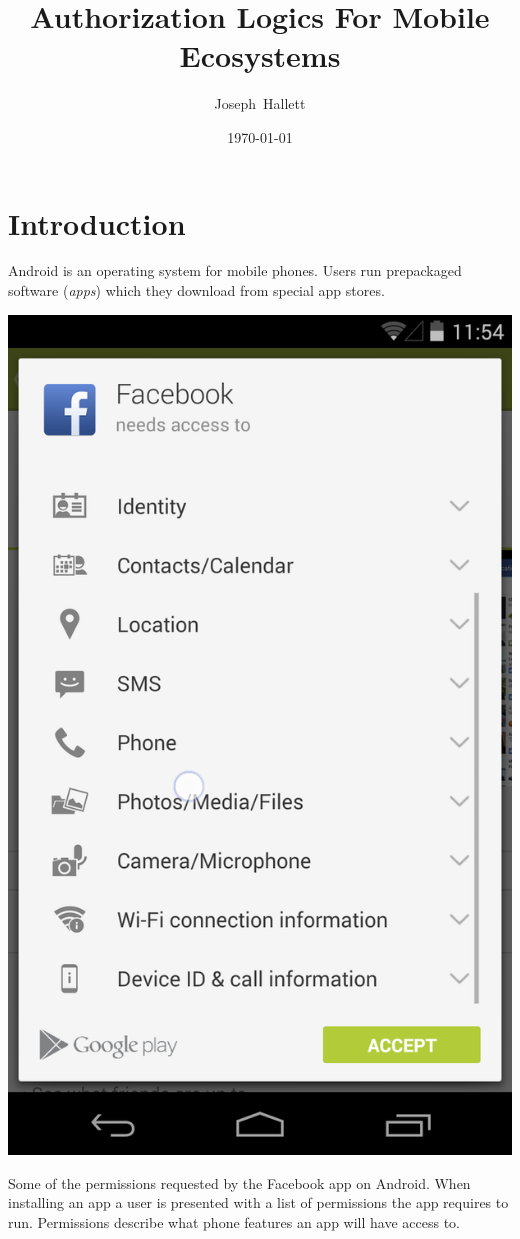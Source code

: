 \documentclass[a4paper]{article}
\title{Authorization Logics For Mobile Ecosystems}%
\author{Joseph~Hallett}
\date\today
\begin{document}
\maketitle
\setcounter{tocdepth}{3}
\tableofcontents
\pagebreak

\section{Introduction}
\label{sec:intro}

Android is an operating system for mobile phones.  Users run prepackaged
software (\emph{apps}) which they download from special app stores.

\begin{marginfigure}
  \includegraphics[width=\smallmarginlength]{img/facebookperms2.png}
  \caption{Some of the permissions requested by the Facebook app on Android.
  When installing an app a user is presented with a list of permissions the app
requires to run.  Permissions describe what phone features an app will have
access to.}
  \label{fig:fb}
\end{marginfigure}
\end{document}
